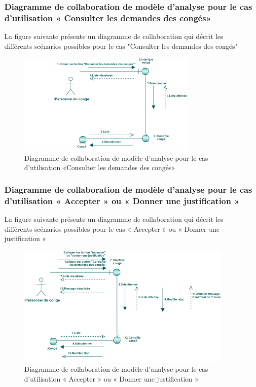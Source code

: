 \documentclass[12 pt ]{report}
\begin{document}
\subsubsection{Diagramme  de  collaboration  de  modèle  d'analyse  pour  le  cas  d'utilisation « Consulter les demandes des congés»  }
La figure suivante présente un diagramme de collaboration qui décrit les différents
scénarios possibles pour le cas "Consulter les demandes des congés"
\begin{figure}[h]
\begin{center}
\includegraphics[width= 12 cm , height =5cm]{colla_dem_con.PNG}
 \caption{Diagramme  de  collaboration  de  modèle  d'analyse  pour  le  cas  d'utilisation «Consulter les demandes des congés»}
\end{center}
\end{figure}
\subsubsection{Diagramme  de  collaboration  de  modèle  d'analyse  pour  le  cas  d'utilisation « Accepter » ou  « Donner une justification »   }
La figure suivante présente un diagramme de collaboration qui décrit les différents
scénarios possibles pour le cas « Accepter » ou  « Donner une justification »  
\begin{figure}[h]
\begin{center}
\includegraphics[width= 12 cm , height =6cm]{colla_acc.PNG}
 \caption{Diagramme  de  collaboration  de  modèle  d'analyse  pour  le  cas  d'utilisation « Accepter » ou  « Donner une justification »  }
\end{center}
\end{figure}
\end{document}
